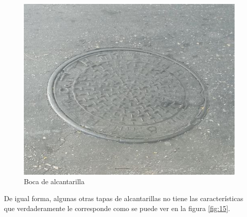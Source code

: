 		\begin{figure}[htb]
			\centering
			\includegraphics[scale = 0.4]{Graphics/pothole_9.jpg}
			\caption{Boca de alcantarilla}
			\label{fig:14}
		\end{figure}

		De igual forma, algunas otras tapas de alcantarillas no tiene las características que verdaderamente le corresponde como se puede ver en la
		figura \ref{fig:15}.

